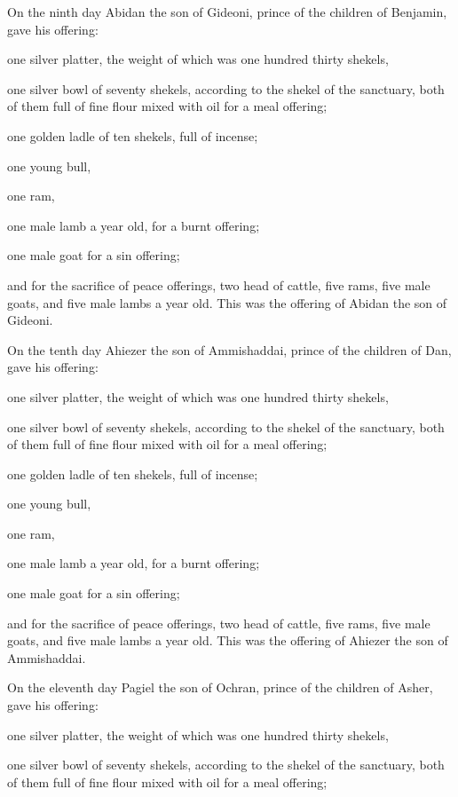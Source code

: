 \myverse{}On the ninth day Abidan the son of Gideoni, prince of the children
of Benjamin,
\myverse{}gave his offering:

one silver platter, the weight of which was one hundred thirty shekels,

one silver bowl of seventy shekels, according to the shekel of the sanctuary, both of them
full of fine flour mixed with oil for a meal offering;


\myverse{}one golden ladle of ten shekels, full of incense;


\myverse{}one young bull,

one ram,

one male lamb a year old, for a burnt offering;


\myverse{}one male goat for a sin offering;


\myverse{}and for the sacrifice of peace offerings, two head of cattle,
five rams, five male goats, and five male lambs a year old. This was the offering of Abidan the son of
Gideoni.


\myverse{}On the tenth day Ahiezer the son of Ammishaddai, prince of the
children of Dan,
\myverse{}gave his offering:

one silver platter, the weight of which was one hundred thirty shekels,

one silver bowl of seventy shekels, according to the shekel of the sanctuary, both of them
full of fine flour mixed with oil for a meal offering;


\myverse{}one golden ladle of ten shekels, full of incense;


\myverse{}one young bull,

one ram,

one male lamb a year old, for a burnt offering;


\myverse{}one male goat for a sin offering;


\myverse{}and for the sacrifice of peace offerings, two head of cattle,
five rams, five male goats, and five male lambs a year old. This was the offering of Ahiezer the son of
Ammishaddai.


\myverse{}On the eleventh day Pagiel the son of Ochran, prince of the children
of Asher,
\myverse{}gave his offering:

one silver platter, the weight of which was one hundred thirty shekels,

one silver bowl of seventy shekels, according to the shekel of the sanctuary, both of them
full of fine flour mixed with oil for a meal offering;


